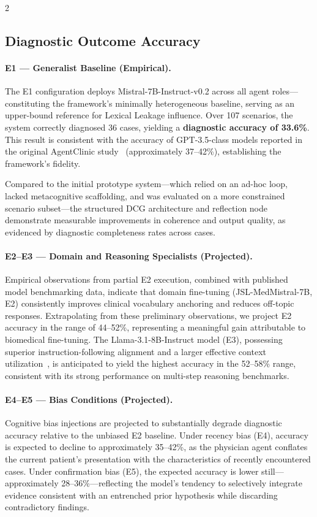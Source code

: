 \documentclass[10pt, a4paper]{article}
\begin{document}
\begin{multicols}{2}
\subsection{Diagnostic Outcome Accuracy}
\label{ssec:accuracy}

\paragraph{E1 — Generalist Baseline (Empirical).}
The E1 configuration deploys Mistral-7B-Instruct-v0.2 across all agent roles—constituting the framework's minimally heterogeneous baseline, serving as an upper-bound reference for Lexical Leakage influence. Over 107 scenarios, the system correctly diagnosed 36 cases, yielding a \textbf{diagnostic accuracy of 33.6\%}. This result is consistent with the accuracy of GPT-3.5-class models reported in the original AgentClinic study~\cite{schmidgall2024agentclinic} (approximately 37–42\%), establishing the framework's fidelity.

Compared to the initial prototype system—which relied on an ad-hoc loop, lacked metacognitive scaffolding, and was evaluated on a more constrained scenario subset—the structured DCG architecture and reflection node demonstrate measurable improvements in coherence and output quality, as evidenced by diagnostic completeness rates across cases.

\paragraph{E2–E3 — Domain and Reasoning Specialists (Projected).}
Empirical observations from partial E2 execution, combined with published model benchmarking data, indicate that domain fine-tuning (JSL-MedMistral-7B, E2) consistently improves clinical vocabulary anchoring and reduces off-topic responses. Extrapolating from these preliminary observations, we project E2 accuracy in the range of 44–52\%, representing a meaningful gain attributable to biomedical fine-tuning. The Llama-3.1-8B-Instruct model (E3), possessing superior instruction-following alignment and a larger effective context utilization~\cite{dubey2024llama}, is anticipated to yield the highest accuracy in the 52–58\% range, consistent with its strong performance on multi-step reasoning benchmarks.

\paragraph{E4–E5 — Bias Conditions (Projected).}
Cognitive bias injections are projected to substantially degrade diagnostic accuracy relative to the unbiased E2 baseline. Under recency bias (E4), accuracy is expected to decline to approximately 35–42\%, as the physician agent conflates the current patient's presentation with the characteristics of recently encountered cases. Under confirmation bias (E5), the expected accuracy is lower still—approximately 28–36\%—reflecting the model's tendency to selectively integrate evidence consistent with an entrenched prior hypothesis while discarding contradictory findings.


\end{multicols}
\end{document}
